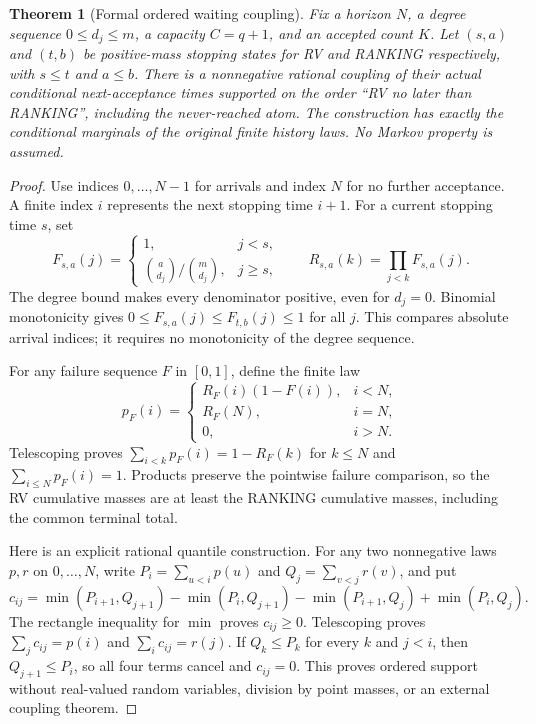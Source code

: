 \documentclass[11pt]{article}
\newtheorem{theorem}{Theorem}
\begin{document}
\begin{theorem}[Formal ordered waiting coupling]\label{thm:leanquantile}
Fix a horizon $N$, a degree sequence $0\leq d_j\leq m$, a capacity
$C=q+1$, and an accepted count $K$. Let $(s,a)$ and $(t,b)$ be
positive-mass stopping states for RV and RANKING respectively, with
$s\leq t$ and $a\leq b$. There is a nonnegative rational coupling
of their actual conditional next-acceptance times supported on the
order ``RV no later than RANKING'', including the never-reached atom.
The construction has exactly the conditional marginals of the original
finite history laws. No Markov property is assumed.
\end{theorem}
\begin{proof}
Use indices $0,\ldots,N-1$ for arrivals and index $N$ for no further
acceptance. A finite index $i$ represents the next stopping time $i+1$.
For a current stopping time $s$, set
\[
 F_{s,a}(j)=
 \begin{cases}
 1,&j<s,\\
 \binom{a}{d_j}/\binom{m}{d_j},&j\geq s,
 \end{cases}
 \qquad R_{s,a}(k)=\prod_{j<k}F_{s,a}(j).
\]
The degree bound makes every denominator positive, even for $d_j=0$.
Binomial monotonicity gives
$0\leq F_{s,a}(j)\leq F_{t,b}(j)\leq1$ for all $j$.
This compares absolute arrival indices; it requires no monotonicity
of the degree sequence.

For any failure sequence $F$ in $[0,1]$, define the finite law
\[
 p_F(i)=
 \begin{cases}
 R_F(i)(1-F(i)),&i<N,\\
 R_F(N),&i=N,\\
 0,&i>N.
 \end{cases}
\]
Telescoping proves $\sum_{i<k}p_F(i)=1-R_F(k)$ for $k\leq N$
and $\sum_{i\leq N}p_F(i)=1$. Products preserve the pointwise
failure comparison, so the RV cumulative masses are at least the
RANKING cumulative masses, including the common terminal total.

Here is an explicit rational quantile construction. For any two
nonnegative laws $p,r$ on $0,\ldots,N$, write
$P_i=\sum_{u<i}p(u)$ and $Q_j=\sum_{v<j}r(v)$, and put
\[
 c_{ij}=\min(P_{i+1},Q_{j+1})-\min(P_i,Q_{j+1})
        -\min(P_{i+1},Q_j)+\min(P_i,Q_j).
\]
The rectangle inequality for $\min$ proves $c_{ij}\geq0$.
Telescoping proves $\sum_jc_{ij}=p(i)$ and
$\sum_ic_{ij}=r(j)$. If $Q_k\leq P_k$ for every $k$ and $j<i$,
then $Q_{j+1}\leq P_i$, so all four terms cancel and $c_{ij}=0$.
This proves ordered support without real-valued random variables,
division by point masses, or an external coupling theorem.


\end{proof}
\end{document}
